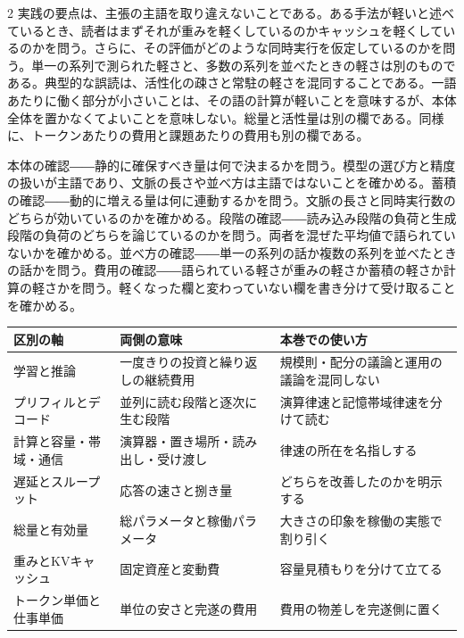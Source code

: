 \documentclass[lualatex,a4paper,10pt]{jlreq}
\begin{document}
\begin{multicols}{2}
実践の要点は、主張の主語を取り違えないことである。ある手法が軽いと述べているとき、読者はまずそれが重みを軽くしているのかキャッシュを軽くしているのかを問う。さらに、その評価がどのような同時実行を仮定しているのかを問う。単一の系列で測られた軽さと、多数の系列を並べたときの軽さは別のものである。典型的な誤読は、活性化の疎さと常駐の軽さを混同することである。一語あたりに働く部分が小さいことは、その語の計算が軽いことを意味するが、本体全体を置かなくてよいことを意味しない。総量と活性量は別の欄である。同様に、トークンあたりの費用と課題あたりの費用も別の欄である。

\begin{themeoverview}[契約の使い方チェックリスト]
本体の確認――静的に確保すべき量は何で決まるかを問う。模型の選び方と精度の扱いが主語であり、文脈の長さや並べ方は主語ではないことを確かめる。蓄積の確認――動的に増える量は何に連動するかを問う。文脈の長さと同時実行数のどちらが効いているのかを確かめる。段階の確認――読み込み段階の負荷と生成段階の負荷のどちらを論じているのかを問う。両者を混ぜた平均値で語られていないかを確かめる。並べ方の確認――単一の系列の話か複数の系列を並べたときの話かを問う。費用の確認――語られている軽さが重みの軽さか蓄積の軽さか計算の軽さかを問う。軽くなった欄と変わっていない欄を書き分けて受け取ることを確かめる。
\end{themeoverview}

\end{multicols}

\begin{center}
\small
\begin{tabularx}{\textwidth}{@{}p{}p{}X@{}}
\toprule
区別の軸 & 両側の意味 & 本巻での使い方 \\
\midrule
学習と推論 & 一度きりの投資と繰り返しの継続費用 & 規模則・配分の議論と運用の議論を混同しない \\
プリフィルとデコード & 並列に読む段階と逐次に生む段階 & 演算律速と記憶帯域律速を分けて読む \\
計算と容量・帯域・通信 & 演算器・置き場所・読み出し・受け渡し & 律速の所在を名指しする \\
遅延とスループット & 応答の速さと捌き量 & どちらを改善したのかを明示する \\
総量と有効量 & 総パラメータと稼働パラメータ & 大きさの印象を稼働の実態で割り引く \\
重みとKVキャッシュ & 固定資産と変動費 & 容量見積もりを分けて立てる \\
トークン単価と仕事単価 & 単位の安さと完遂の費用 & 費用の物差しを完遂側に置く \\
\bottomrule
\end{tabularx}
\end{center}
\autocite{kaplan2020,chinchilla,orca}
\end{document}
